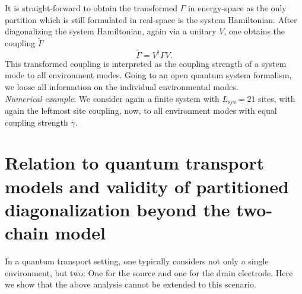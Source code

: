 \documentclass{article}
\begin{document}
It is straight-forward to obtain the transformed $\Gamma$ in energy-space as the only partition which is still formulated in real-space is the system Hamiltonian. After diagonalizing the system Hamiltonian, again via a unitary $V$, one obtains the coupling $\tilde{\Gamma}$
\begin{equation}
	\tilde{\Gamma} = V^\dagger \Gamma V.
\end{equation}
This transformed coupling is interpreted as the coupling strength of a system mode to all environment modes. 
Going to an open quantum system formalism, we loose all information on the individual environmental modes. \\
\indent \textit{Numerical example}: We consider again a finite system with $L_\mathrm{sys}=21$ sites, with again the leftmost site coupling, now, to all environment modes with equal coupling strength $\gamma$. 
\section{Relation to quantum transport models and validity of partitioned diagonalization beyond the two-chain model}
In a quantum transport setting, one typically considers not only a single environment, but two: One for the source and one for the drain electrode. Here we show that the above analysis cannot be extended to this scenario.
\end{document}

